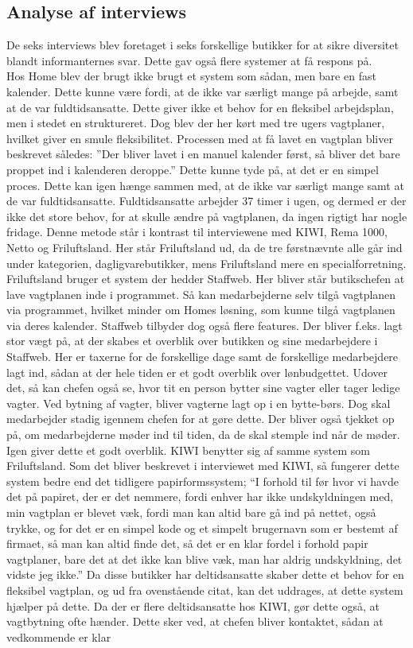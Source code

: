 \subsection{Analyse af interviews}
De seks interviews blev foretaget i seks forskellige butikker for at sikre diversitet blandt informanternes svar. Dette gav også flere systemer at få respons på. 
\\Hos Home blev der brugt ikke brugt et system som sådan, men bare en fast kalender. Dette kunne være fordi, at de ikke var særligt mange på arbejde, samt at de var fuldtidsansatte. Dette giver ikke et behov for en fleksibel arbejdsplan, men i stedet en struktureret. Dog blev der her kørt med tre ugers vagtplaner, hvilket giver en smule fleksibilitet. Processen med at få lavet en vagtplan bliver beskrevet således: ”Der bliver lavet i en manuel kalender først, så bliver det bare proppet ind i kalenderen deroppe.” Dette kunne tyde på, at det er en simpel proces. Dette kan igen hænge sammen med, at de ikke var særligt mange samt at de var fuldtidsansatte. Fuldtidsansatte arbejder 37 timer i ugen, og dermed er der ikke det store behov, for at skulle ændre på vagtplanen, da ingen rigtigt har nogle fridage. Denne metode står i kontrast til interviewene med KIWI, Rema 1000, Netto og Friluftsland. Her står Friluftsland ud, da de tre førstnævnte alle går ind under kategorien, dagligvarebutikker, mens Friluftsland mere en specialforretning. Friluftsland bruger et system der hedder Staffweb. Her bliver står butikschefen at lave vagtplanen inde i programmet. Så kan medarbejderne selv tilgå vagtplanen via programmet, hvilket minder om Homes løsning, som kunne tilgå vagtplanen via deres kalender. Staffweb tilbyder dog også flere features. Der bliver f.eks. lagt stor vægt på, at der skabes et overblik over butikken og sine medarbejdere i Staffweb. Her er taxerne for de forskellige dage samt de forskellige medarbejdere lagt ind, sådan at der hele tiden er et godt overblik over lønbudgettet. Udover det, så kan chefen også se, hvor tit en person bytter sine vagter eller tager ledige vagter. Ved bytning af vagter, bliver vagterne lagt op i en bytte-børs. Dog skal medarbejder stadig igennem chefen for at gøre dette. Der bliver også tjekket op på, om medarbejderne møder ind til tiden, da de skal stemple ind når de møder. Igen giver dette et godt overblik. KIWI benytter sig af samme system som Friluftsland. Som det bliver beskrevet i interviewet med KIWI, så fungerer dette system bedre end det tidligere papirformssystem; “I forhold til før hvor vi havde det på papiret, der er det nemmere, fordi enhver har ikke undskyldningen med, min vagtplan er blevet væk, fordi man kan altid bare gå ind på nettet, også trykke, og for det er en simpel kode og et simpelt brugernavn som er bestemt af firmaet, så man kan altid finde det, så det er en klar fordel i forhold papir vagtplaner, bare det at det ikke kan blive væk, man har aldrig undskyldning, det vidste jeg ikke.” Da disse butikker har deltidsansatte skaber dette et behov for en fleksibel vagtplan, og ud fra ovenstående citat, kan det uddrages, at dette system hjælper på dette. Da der er flere deltidsansatte hos KIWI, gør dette også, at vagtbytning ofte hænder. Dette sker ved, at chefen bliver kontaktet, sådan at vedkommende er klar 